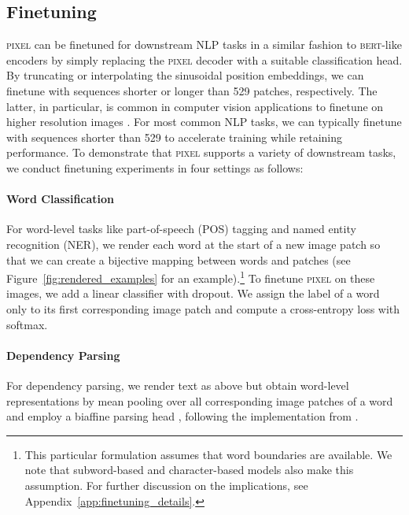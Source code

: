 \documentclass{article}
\newcommand{\model}{\textsc{pixel}\xspace}
\begin{document}
\vspace{-2mm}
\subsection{Finetuning}
\label{sec:finetuning}
\vspace{-2mm}

\model can be finetuned for downstream NLP tasks in a similar fashion to \textsc{bert}-like encoders by simply replacing the \model decoder with a suitable classification head. By truncating or interpolating the sinusoidal position embeddings, we can finetune with sequences shorter or longer than 529 patches, respectively. The latter, in particular, is common in computer vision applications to finetune on higher resolution images \citep{touvron-etal-2019, kolesnikov-etal-2020, dosovitskiy2021an, he-etal-2022-mae}. For most common NLP tasks, we can typically finetune with sequences shorter than 529 to accelerate training while retaining performance. To demonstrate that \model supports a variety of downstream tasks, we conduct finetuning experiments in four settings as follows:

\vspace{-2mm}
\paragraph{Word Classification} For word-level tasks like part-of-speech (POS) tagging and named entity recognition (NER), we render each word at the start of a new image patch so that we can create a bijective mapping between words and patches (see Figure~\ref{fig:rendered_examples} for an example).\footnote{This particular formulation assumes that word boundaries are available. We note that subword-based and character-based models also make this assumption. For further discussion on the implications, see Appendix~\ref{app:finetuning_details}.} To finetune \model on these images, we add a linear classifier with dropout. We assign the label of a word only to its first corresponding image patch and compute a cross-entropy loss with softmax.

\vspace{-2mm}
\paragraph{Dependency Parsing} For dependency parsing, we render text as above but obtain word-level representations by mean pooling over all corresponding image patches of a word and employ a biaffine parsing head \citep{DBLP:conf/iclr/DozatM17}, following the implementation from \cite{glavas-vulic-2021-supervised}.
\end{document}
